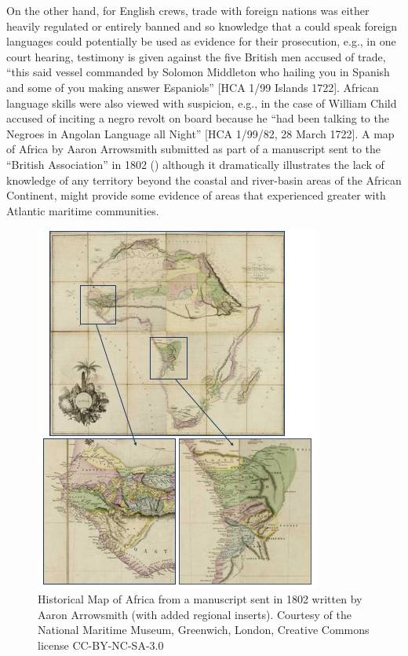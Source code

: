   On the other hand, for English crews, trade with foreign nations was either heavily regulated or entirely banned and so knowledge that a  could speak foreign languages could potentially be used as evidence for their prosecution, e.g., in one court hearing, testimony is given against the five British men accused of  trade, “this said vessel commanded by Solomon Middleton who hailing you in Spanish and some of you making answer Espaniols” [HCA 1/99  Islands 1722]. African language skills were also viewed with suspicion, e.g., in the case of William Child accused of inciting a negro revolt on board because he “had been talking to the Negroes in Angolan Language all Night” [HCA 1/99/82, 28 March {1722}]. A map of Africa by Aaron Arrowsmith submitted as part of a manuscript sent to the “British Association” in 1802 () although it dramatically illustrates the lack of knowledge of any territory beyond the coastal and river-basin areas of the African Continent, might provide some evidence of areas that experienced greater  with Atlantic maritime communities. 

\begin{figure}
 

\includegraphics[width=\textwidth]{figures/delgado-img5.png}

\caption{\label{fig:key:3.5} Historical Map of Africa from a manuscript sent in 1802 written by Aaron Arrowsmith (with added regional inserts). Courtesy of the National Maritime Museum, Greenwich, London, Creative Commons license CC-BY-NC-SA-3.0}
\end{figure}

